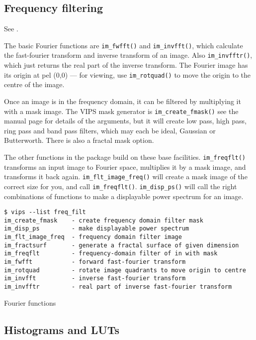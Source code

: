 \subsection{Frequency filtering}

See .

The basic Fourier functions are \verb+im_fwfft()+ and
\verb+im_invfft()+, which calculate the fast-fourier transform and inverse
transform of an image. Also \verb+im_invfftr()+, which just returns the real
part of the inverse transform.
The Fourier image has its origin at pel (0,0) ---
for viewing, use \verb+im_rotquad()+ to move the origin to the centre of
the image.

Once an image is in the frequency domain, it can be filtered by multiplying
it with a mask image. The VIPS mask generator is \verb+im_create_fmask()+
see the manual page for details of the arguments, but it will create low
pass, high pass, ring pass and band pass filters, which may each be ideal,
Gaussian or Butterworth. There is also a fractal mask option.

The other functions in the package build on these base
facilities. \verb+im_freqflt()+ transforms an input image to
Fourier space, multiplies it by a mask image, and transforms it back
again. \verb+im_flt_image_freq()+ will create a mask image of the correct
size for you, and call \verb+im_freqflt()+.  \verb+im_disp_ps()+ will call
the right combinations of functions to make a displayable power spectrum
for an image.

\begin{fig2}
\begin{verbatim}
$ vips --list freq_filt    
im_create_fmask    - create frequency domain filter mask
im_disp_ps         - make displayable power spectrum
im_flt_image_freq  - frequency domain filter image
im_fractsurf       - generate a fractal surface of given dimension
im_freqflt         - frequency-domain filter of in with mask
im_fwfft           - forward fast-fourier transform
im_rotquad         - rotate image quadrants to move origin to centre
im_invfft          - inverse fast-fourier transform
im_invfftr         - real part of inverse fast-fourier transform
\end{verbatim}
\caption{Fourier functions}
\label{fg:freq}
\end{fig2}

\subsection{Histograms and LUTs}

